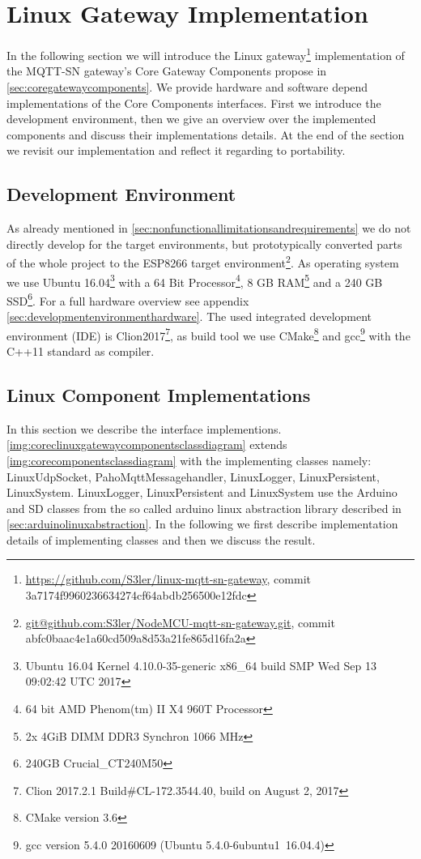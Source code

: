 \section{Linux Gateway Implementation}\label{sec:linuxgatewayimplementation}
In the following section we will introduce the Linux gateway\footnote{\url{https://github.com/S3ler/linux-mqtt-sn-gateway}, commit 3a7174f9960236634274cf64abdb256500e12fdc} implementation of the MQTT-SN gateway's Core Gateway Components propose in \autoref{sec:coregatewaycomponents}.
We provide hardware and software depend implementations of the Core Components interfaces.
First we introduce the development environment, then we give an overview over the implemented components and discuss their implementations details.
At the end of the section we revisit our implementation and reflect it regarding to portability.

\subsection{Development Environment}\label{sec:developmentenvironment}
As already mentioned in \autoref{sec:nonfunctionallimitationsandrequirements} we do not directly develop for the target environments, but prototypically converted parts of the whole project to the ESP8266 target environment\footnote{\url{git@github.com:S3ler/NodeMCU-mqtt-sn-gateway.git}, commit abfc0baac4e1a60cd509a8d53a21fe865d16fa2a}.
As operating system we use Ubuntu 16.04\footnote{Ubuntu 16.04 Kernel 4.10.0-35-generic x86\_64 build SMP Wed Sep 13 09:02:42 UTC 2017} with a 64 Bit Processor\footnote{64 bit AMD Phenom(tm) II X4 960T Processor}, 8 GB RAM\footnote{2x 4GiB DIMM DDR3 Synchron 1066 MHz} and a 240 GB SSD\footnote{240GB Crucial\_CT240M50}.
For a full hardware overview see appendix \autoref{sec:developmentenvironmenthardware}.
The used integrated development environment (IDE) is Clion2017\footnote{Clion 2017.2.1 Build\#CL-172.3544.40, build on August 2, 2017}, as build tool we use CMake\footnote{CMake version 3.6} and gcc\footnote{gcc version 5.4.0 20160609 (Ubuntu 5.4.0-6ubuntu1~16.04.4)} with the C++11 standard\cite{ISO:2012:III} as compiler.

\subsection{Linux Component Implementations}\label{sec:linxcomponentimplementations}
In this section we describe the interface implementions. \autoref{img:coreclinuxgatewaycomponentsclassdiagram}
extends \autoref{img:corecomponentsclassdiagram} with the implementing classes namely: LinuxUdpSocket, PahoMqttMessagehandler, LinuxLogger, LinuxPersistent, LinuxSystem.
LinuxLogger, LinuxPersistent and LinuxSystem use the Arduino and SD classes from the so called arduino linux abstraction library described in \autoref{sec:arduinolinuxabstraction}.
In the following we first describe implementation details of implementing classes and then we discuss the result.


